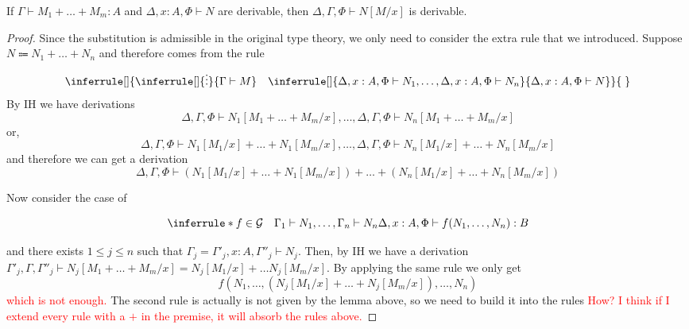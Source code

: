 \documentclass[acmsmall,screen, nonacm, anonymous]{acmart}
\begin{document}
\begin{lemma}[Substitution]
  If $\Gamma \vdash M_1 + \ldots + M_m : A$ and $\Delta, x : A, \Phi \vdash N$ are derivable, then $\Delta, \Gamma, \Phi \vdash N[M/x]$ is derivable.
\end{lemma}
\begin{proof}
  Since the substitution is admissible in the original type theory, we only need to consider the extra rule that we introduced.
  Suppose $N \Coloneqq N_1 + \ldots + N_n$ and therefore comes from the rule
  \[
  \inferrule[]{\inferrule[]{\vdots}{\Gamma \vdash M} \quad \inferrule[]{\Delta, x : A, \Phi \vdash N_1, \ldots, \Delta, x : A, \Phi \vdash N_n}{\Delta, x : A, \Phi \vdash N}}{\;}
  \]
  By IH we have derivations
  \[
    \Delta, \Gamma, \Phi \vdash N_1[M_1 + \ldots + M_m /x], \ldots, \Delta, \Gamma, \Phi \vdash N_n[M_1 + \ldots + M_m /x]
  \]
  or,
  \[
    \Delta, \Gamma, \Phi \vdash N_1[M_1/ x] + \ldots + N_1[M_m /x], \ldots, \Delta, \Gamma, \Phi \vdash N_n[M_1 / x] + \ldots + N_n[M_m /x]
  \]
  and therefore we can get a derivation 
  \[
  \Delta, \Gamma, \Phi \vdash (N_1[M_1/ x] + \ldots + N_1[M_m /x]) + \ldots + (N_n[M_1/ x] + \ldots + N_n[M_m /x])
  \]

  Now consider the case of

  \[
  \inferrule*{f \in \mathcal{G} \quad \Gamma_1 \vdash N_1, \ldots, \Gamma_n \vdash N_n}{\Delta , x : A, \Phi \vdash f(N_1, \ldots, N_n) : B}
  \]

  and there exists $1 \leq j \leq n$ such that $\Gamma_j = \Gamma'_j, x : A, \Gamma''_j \vdash N_j$.
  Then, by IH we have a derivation $\Gamma'_j,\Gamma,\Gamma''_j \vdash N_j[M_1 + \ldots + M_m / x] = N_j[M_1 / x] + \ldots N_j[M_m / x]$.
  By applying the same rule we only get 
  \[
  f(N_1, \ldots, (N_j[M_1/x] + \ldots + N_j[M_m / x]), \ldots, N_n)
  \]
  \textcolor{red}{which is not enough.}
  The second rule is actually is not given by the lemma above, so we need to build it into the rules \textcolor{red}{How? I think if I extend every rule with a $+$ in the premise, it will absorb the rules above.}
\end{proof}
\end{document}
